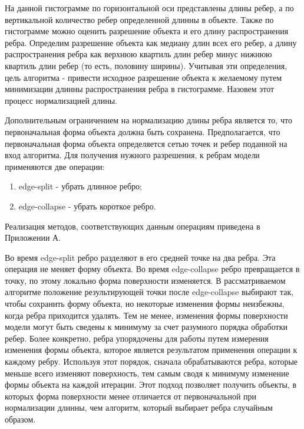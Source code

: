 \documentclass[14pt]{article}
\numberwithin{figure}{section}
\numberwithin{equation}{section}
\begin{document}
На данной гистограмме по горизонтальной оси представлены длины ребер, а по вертикальной количество ребер определенной длинны в объекте. Также по гистограмме можно оценить разрешение объекта и его длину распространения ребра. Определим разрешение объекта как медиану длин всех его ребер, а длину распространения ребра как верхнюю квартиль длин ребер минус нижнюю квартиль длин ребер (то есть, половину ширины). Учитывая эти определения, цель алгоритма - привести исходное разрешение объекта к желаемому путем минимизации длинны распространения ребра в гистограмме. Назовем этот процесс нормализацией длины.

Дополнительным ограничением на нормализацию длины ребра является то, что первоначальная форма объекта должна быть сохранена. Предполагается, что первоначальная форма объекта определяется сетью точек и ребер поданной на вход алгоритма. Для получения нужного разрешения, к ребрам модели применяются две операции:

\begin{enumerate}
	\item
	edge-split - убрать длинное ребро;
	\item
	edge-collapse - убрать короткое ребро.
\end{enumerate}

Реализация методов, соответствующих данным операциям приведена в Приложении А.

Во время edge-split ребро разделяют в его средней точке на два ребра. Эта операция не меняет форму объекта. Во время edge-collapse ребро превращается в точку, по этому локально форма поверхности изменяется. В рассматриваемом алгоритме положение результирующей точки после edge-collapse выбирают так, чтобы сохранить форму объекта, но некоторые изменения формы неизбежны, когда ребра приходится удалять. Тем не менее, изменения формы поверхности модели могут быть сведены к минимуму за счет разумного порядка обработки ребер. Более конкретно, ребра упорядочены для работы путем измерения изменения формы объекта, которое является результатом применения операции к каждому ребру. Используя этот порядок, сначала обрабатываются ребра, которые меньше всего изменяют поверхность, тем самым сводя к минимуму изменение формы объекта на каждой итерации. Этот подход позволяет получить объекты, в которых форма поверхности менее отличается от первоначальной при нормализации длинны, чем алгоритм, который выбирает ребра случайным образом.

\end{document}
